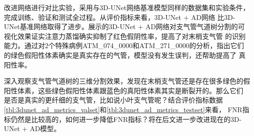 改进网络进行对比实验，采用与3D-UNet网络基准模型同样的数据集和实验条件，完成训练、验证和测试全过程。从评价指标来看，3D-UNet + AD网络
比3D-UNet基准网络取得了进步。展示的3D-UNet + AD网络对支气管气道树分割的可视化效果证实注意力蒸馏确实抑制了红色假阴性率，提高了对末梢支气管
的识别能力。通过对2个特殊病例ATM\_074\_0000和ATM\_271\_0000的分析，指出它们的绿色假阳性体素确实是真实存在的气管，模型没有发生误判，还帮助提高了
真阳性率。

深入观察支气管气道树的三维分割效果，发现在末梢支气管还是存在很多绿色的假阳性体素，这些绿色假阳性体素跟蓝色的真阳性体素其实是断裂开的。那么它们
是否是真实的更纤细的支气管，比如说小叶支气管呢？结合评价指标数据\autoref{tbl:3dunet_ad_metrics_valset}和\autoref{tbl:3dunet_ad_metrics_testset}来看，
FNR指标仍然是比较高的，如何进一步降低FNR指标？将在后文进一步改进现在的3D-UNet + AD模型。